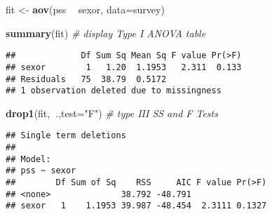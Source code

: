 \documentclass[]{article}
\newenvironment{Shaded}{\begin{snugshade}}{\end{snugshade}}
\newcommand{\KeywordTok}[1]{\textcolor[rgb]{0.13,0.29,0.53}{\textbf{#1}}}
\newcommand{\DataTypeTok}[1]{\textcolor[rgb]{0.13,0.29,0.53}{#1}}
\newcommand{\StringTok}[1]{\textcolor[rgb]{0.31,0.60,0.02}{#1}}
\newcommand{\CommentTok}[1]{\textcolor[rgb]{0.56,0.35,0.01}{\textit{#1}}}
\newcommand{\OperatorTok}[1]{\textcolor[rgb]{0.81,0.36,0.00}{\textbf{#1}}}
\newcommand{\NormalTok}[1]{#1}
\begin{document}
\begin{Shaded}
\begin{Highlighting}[]
\NormalTok{fit <-}\StringTok{ }\KeywordTok{aov}\NormalTok{(pss }\OperatorTok{~}\StringTok{ }\NormalTok{sexor, }\DataTypeTok{data=}\NormalTok{survey)}

\KeywordTok{summary}\NormalTok{(fit) }\CommentTok{# display Type I ANOVA table}
\end{Highlighting}
\end{Shaded}

\begin{verbatim}
##             Df Sum Sq Mean Sq F value Pr(>F)
## sexor        1   1.20  1.1953   2.311  0.133
## Residuals   75  38.79  0.5172               
## 1 observation deleted due to missingness
\end{verbatim}

\begin{Shaded}
\begin{Highlighting}[]
\KeywordTok{drop1}\NormalTok{(fit,}\OperatorTok{~}\NormalTok{.,}\DataTypeTok{test=}\StringTok{"F"}\NormalTok{) }\CommentTok{# type III SS and F Tests}
\end{Highlighting}
\end{Shaded}

\begin{verbatim}
## Single term deletions
## 
## Model:
## pss ~ sexor
##        Df Sum of Sq    RSS     AIC F value Pr(>F)
## <none>              38.792 -48.791               
## sexor   1    1.1953 39.987 -48.454  2.3111 0.1327
\end{verbatim}
\end{document}
